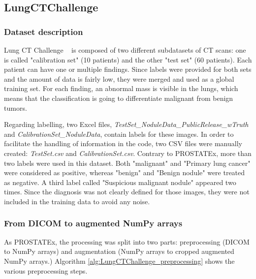 \subsection{LungCTChallenge}
\label{sec:lungCTChallenge}
\subsubsection{Dataset description}
\setlength{\marginparwidth}{3cm}\leavevmode {}Lung CT Challenge ~\cite{12, 36, 38} is composed of two different subdatasets of CT scans: one is called "calibration set" (10 patients) and the other "test set" (60 patients). Each patient can have one or multiple findings. Since labels were provided for both sets and the amount of data is fairly low, they were merged and used as a global training set. For each finding, an abnormal mass is visible in the lungs, which means that the classification is going to differentiate malignant from benign tumors.

Regarding labelling, two Excel files, \textit{TestSet\_NoduleData\_PublicRelease\_wTruth} and \textit{CalibrationSet\_NoduleData}, contain labels for these images. In order to facilitate the handling of information in the code, two CSV files were manually created: \mbox{\textit{TestSet.csv}} and \textit{CalibrationSet.csv}.
Contrary to PROSTATEx, more than two labels were used in this dataset. Both "malignant" and "Primary lung cancer" were considered as positive, whereas "benign" and "Benign nodule" were treated as negative. A third label called "Suspicious malignant nodule" appeared two times. Since the diagnosis was not clearly defined for those images, they were not included in the training data to avoid any noise. 


\subsubsection{From DICOM to augmented NumPy arrays}
\setlength{\marginparwidth}{3cm}\leavevmode {}As PROSTATEx, the processing was split into two parts: preprocessing (DICOM to NumPy arrays) and augmentation (NumPy arrays to cropped augmented NumPy arrays.) Algorithm \ref{alg:LungCTChallenge_preprocessing} shows the various preprocessing steps.

